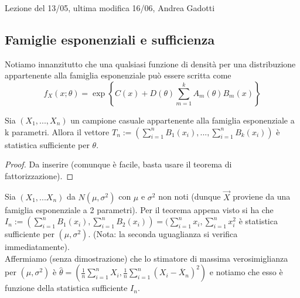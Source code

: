 
Lezione del 13/05, ultima modifica 16/06, Andrea Gadotti

\subsection{Famiglie esponenziali e sufficienza}

Notiamo innanzitutto che una qualsiasi funzione di densità per una distribuzione appartenente alla famiglia esponenziale può essere scritta come
$$f_X(x;\theta) = \exp \left\lbrace C(x) + D(\theta) \displaystyle \sum_{m=1}^k A_m(\theta) B_m(x) \right\rbrace$$

\begin{teo}

Sia $(X_1,...,X_n)$ un campione casuale appartenente alla famiglia esponenziale a k parametri. Allora il vettore $T_n:=(\sum_{i=1}^n B_1(x_i),...,\sum_{i=1}^n B_k(x_i))$ è statistica sufficiente per $\theta$.

\begin{proof}
Da inserire (comunque è facile, basta usare il teorema di fattorizzazione).
\end{proof}

\end{teo}

\begin{esempio}
Sia $(X_1,...X_n)$ da $N(\mu, \sigma^2)$ con $\mu$ e $\sigma^2$ non noti (dunque $\vec{X}$ proviene da una famiglia esponenziale a 2 parametri). Per il teorema appena visto si ha che $I_n:= (\sum_{i=1}^n B_1(x_i), \sum_{i=1}^n B_2(x_i)) = (\sum_{i=1}^n x_i, \sum_{i=1}^n x_i^2$ è statistica sufficiente per $(\mu, \sigma^2)$. (Nota: la seconda uguaglianza si verifica immediatamente).\\
Affermiamo (senza dimostrazione) che lo stimatore di massima verosimiglianza per $(\mu, \sigma^2)$ è $\hat{\theta} = \left( \frac{1}{n} \sum_{i=1}^n X_i, \frac{1}{n} \sum_{i=1}^n (X_i - \overline{X}_n)^2 \right)$ e notiamo che esso è funzione della statistica sufficiente $I_n$.\\
\\
\end{esempio}